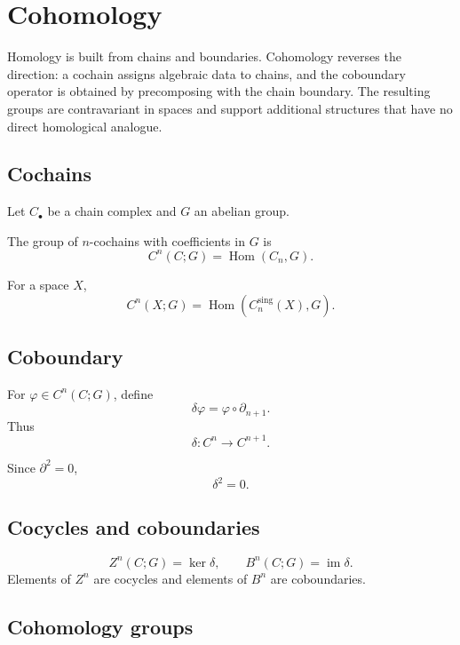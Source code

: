 ﻿\chapter{Cohomology}
\label{ch:viii28-cohomology}

Homology is built from chains and boundaries.  Cohomology reverses the
direction: a cochain assigns algebraic data to chains, and the coboundary
operator is obtained by precomposing with the chain boundary.  The resulting
groups are contravariant in spaces and support additional structures that have
no direct homological analogue.

\section{Cochains}

Let \(C_\bullet\) be a chain complex and \(G\) an abelian group.

\begin{definition}
\label{def:viii28-cochains}
The group of \(n\)-cochains with coefficients in \(G\) is
\[
C^n(C;G)=\operatorname{Hom}(C_n,G).
\]
\end{definition}

For a space \(X\),
\[
C^n(X;G)=\operatorname{Hom}(C_n^{\mathrm{sing}}(X),G).
\]

\section{Coboundary}

\begin{definition}
\label{def:viii28-coboundary}
For \(\varphi\in C^n(C;G)\), define
\[
\delta\varphi=\varphi\circ\partial_{n+1}.
\]
Thus
\[
\delta:C^n\to C^{n+1}.
\]
\end{definition}

Since \(\partial^2=0\),
\[
\delta^2=0.
\]

\section{Cocycles and coboundaries}

\begin{definition}
\label{def:viii28-cocycles}
\[
Z^n(C;G)=\ker\delta,
\qquad
B^n(C;G)=\operatorname{im}\delta.
\]
Elements of \(Z^n\) are cocycles and elements of \(B^n\) are coboundaries.
\end{definition}

\section{Cohomology groups}

